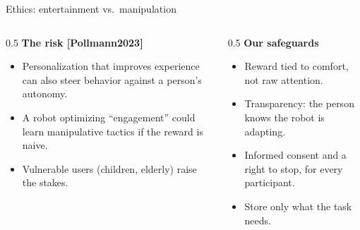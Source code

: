 \documentclass[aspectratio=169,10pt]{beamer}
\newcommand{\refnum}[1]{{\footnotesize\color{giuaccent}[#1]}}
\begin{document}
\begin{frame}{Ethics: entertainment vs.\ manipulation}
  \begin{columns}[T]
    \begin{column}{0.5\textwidth}
      \textbf{The risk \refnum{Pollmann2023}}
      \begin{itemize}\footnotesize
        \item Personalization that improves experience can also steer behavior against a person's autonomy.
        \item A robot optimizing ``engagement'' could learn manipulative tactics if the reward is naive.
        \item Vulnerable users (children, elderly) raise the stakes.
      \end{itemize}
    \end{column}
    \begin{column}{0.5\textwidth}
      \textbf{Our safeguards}
      \begin{itemize}\footnotesize
        \item Reward tied to comfort, not raw attention.
        \item Transparency: the person knows the robot is adapting.
        \item Informed consent and a right to stop, for every participant.
        \item Store only what the task needs.
      \end{itemize}
    \end{column}
  \end{columns}
\end{frame}
\end{document}
